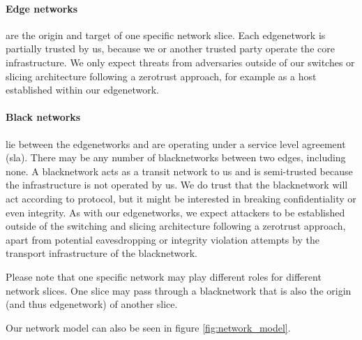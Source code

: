 \paragraph{Edge networks}
are the origin and target of one specific network slice. Each \gls{edgenetwork} is partially trusted by us, because we or another trusted party operate the core infrastructure. We only expect threats from adversaries outside of our switches or slicing architecture following a \gls{zerotrust} approach, for example as a host established within our \gls{edgenetwork}.

\paragraph{Black networks}
lie between the \gls{edgenetwork}s and are operating under a service level agreement (\acrshort{sla}). There may be any number of \gls{blacknetwork}s between two edges, including none. A \gls{blacknetwork} acts as a transit network to us and is semi-trusted because the infrastructure is not operated by us. We do trust that the \gls{blacknetwork} will act according to protocol, but it might be interested in breaking confidentiality or even integrity. As with our \gls{edgenetwork}s, we expect attackers to be established outside of the switching and slicing architecture following a \gls{zerotrust} approach, apart from potential eavesdropping or integrity violation attempts by the transport infrastructure of the \gls{blacknetwork}.

Please note that one specific network may play different roles for different network slices. One slice may pass through a \gls{blacknetwork} that is also the origin (and thus \gls{edgenetwork}) of another slice.

Our network model can also be seen in figure \ref{fig:network_model}.


